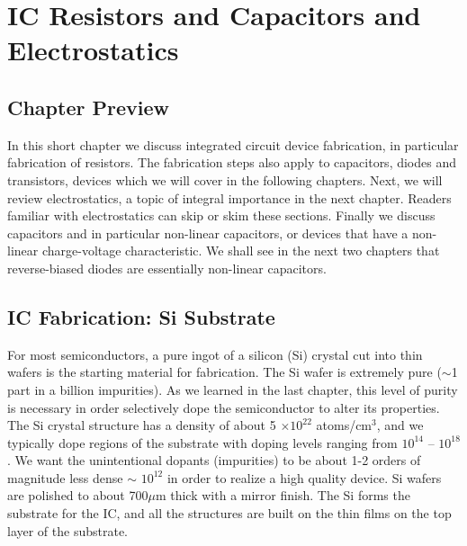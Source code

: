 \chapter{IC Resistors and Capacitors and Electrostatics}
\label{ch:ch04_ic_tech}
\graphicspath{{./figs_ic_tech/}}
\section{Chapter Preview}
In this short chapter we discuss integrated circuit device fabrication, in particular fabrication of resistors.  The fabrication steps also apply to capacitors, diodes and transistors, devices which we will cover in the following chapters.  Next, we will review electrostatics, a topic of integral importance in the next chapter.  Readers familiar with electrostatics can skip or skim these sections.  Finally we discuss capacitors and in particular non-linear capacitors, or devices that have a non-linear charge-voltage characteristic.  We shall see in the next two chapters that reverse-biased diodes are essentially non-linear capacitors.
\section{IC Fabrication: Si Substrate}
For most semiconductors, a pure ingot of a silicon (Si) crystal cut into thin wafers is the starting material for fabrication.  The Si wafer is extremely pure ($\sim$1 part in a billion impurities).  As we learned in the last chapter, this level of purity is necessary in order selectively dope the semiconductor to alter its properties.  The Si crystal structure has a density of about 5 $\times 10^{22}$ atoms/cm$^3$, and we typically dope regions of the substrate with doping levels ranging from  $10^{14}$ – $10^{18}$.  We want the  unintentional dopants (impurities) to be about 1-2 orders of magnitude less dense $\sim$ $10^{12}$ in order to realize a high quality device.  
Si wafers are polished to about 700$\mu$m thick with a mirror finish.   The Si forms the substrate for the IC, and all the structures are built on the thin films on the top layer of the substrate.  
